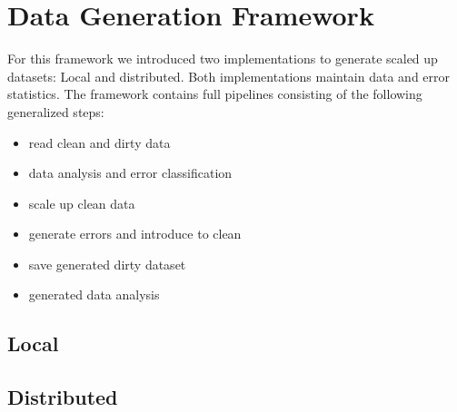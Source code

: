 \section{Data Generation Framework}
\label{sec:data_gen}
For this framework we introduced two implementations to generate scaled up datasets: Local and distributed.
Both implementations maintain data and error statistics. 
The framework contains full pipelines consisting of the following generalized steps:

\begin{itemize}
    \item read clean and dirty data
    \item data analysis and error classification
    \item scale up clean data
    \item generate errors and introduce to clean 
    \item save generated dirty dataset
    \item generated data analysis
\end{itemize}

\subsection{Local}
\label{sec:local_generator}



\subsection{Distributed}
\label{sec:distributed_generator}



